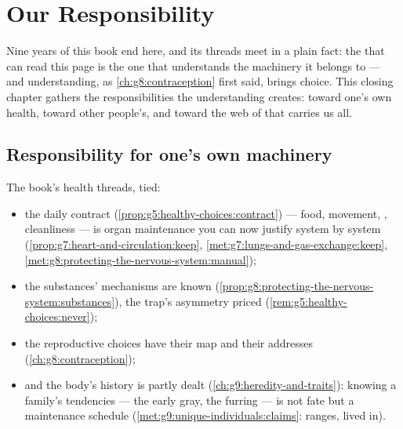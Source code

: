 \chapter{Our Responsibility}\label{ch:g9:our-responsibility}

Nine years of this book end here, and its threads meet in a
plain fact: the  that can read this page is the one
 that understands the machinery it belongs to --- and
understanding, as \cref{ch:g8:contraception} first said,
brings choice. This closing chapter gathers the
responsibilities the understanding creates: toward one's own
health, toward other people's, and toward the web of  that carries us all.

\section{Responsibility for one's own machinery}

\begin{proposition}\label{prop:g9:our-responsibility:self}
The book's health threads, tied:
\begin{itemize}
  \item the daily contract
        (\cref{prop:g5:healthy-choices:contract}) ---
        food, movement, , cleanliness --- is organ
        maintenance you can now justify system by system
        (\cref{prop:g7:heart-and-circulation:keep},
        \cref{met:g7:lungs-and-gas-exchange:keep},
        \cref{met:g8:protecting-the-nervous-system:manual});
  \item the substances' mechanisms are known
        (\cref{prop:g8:protecting-the-nervous-system:substances}),
        the trap's asymmetry priced
        (\cref{rem:g5:healthy-choices:never});
  \item the reproductive choices have their map and their
        addresses (\cref{ch:g8:contraception});
  \item and the body's history is partly dealt
        (\cref{ch:g9:heredity-and-traits}): knowing a
        family's tendencies --- the early gray, the
        furring  --- is not fate but a maintenance
        schedule (\cref{met:g9:unique-individuals:claims}:
        ranges, lived in).
\end{itemize}
\end{proposition}
\admitted


